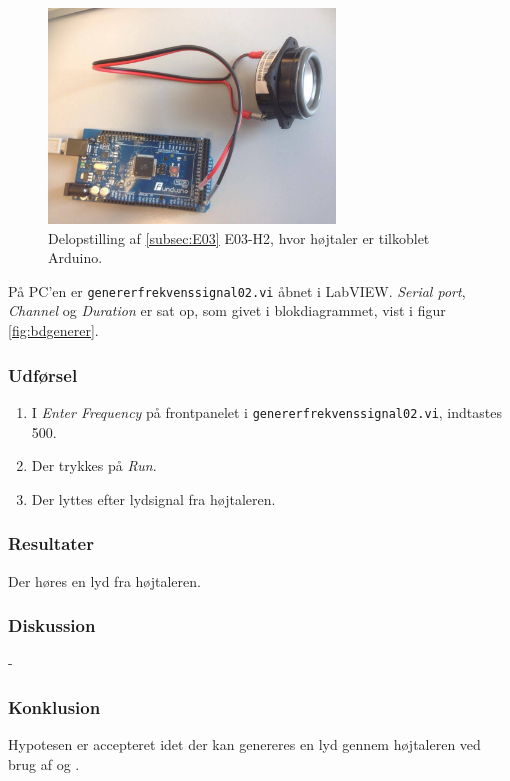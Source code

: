 			\begin{figure}[htb]
			\centering
				\includegraphics[width=3in]{hbArduino}
				\caption{Delopstilling af \ref{subsec:E03} E03-H2, hvor højtaler er tilkoblet Arduino.}	
				\label{fig:tores}
			\end{figure}
	  
		På PC'en er \texttt{genererfrekvenssignal02.vi} åbnet i LabVIEW. \textit{Serial port}, \textit{Channel} og \textit{Duration} er sat op, som givet i blokdiagrammet, vist i figur \ref{fig:bdgenerer}.   \\   
	
	\subsubsection{Udførsel}
			\begin{enumerate} 
				\item I \textit{Enter Frequency} på frontpanelet i \texttt{genererfrekvenssignal02.vi}, indtastes 500. 
				\item Der trykkes på \textit{Run}. 
				\item Der lyttes efter lydsignal fra højtaleren.  
			\end{enumerate}
			
		\subsubsection{Resultater}
		Der høres en lyd fra højtaleren. 
		\subsubsection{Diskussion} 
		-
		\subsubsection{Konklusion}
		Hypotesen er accepteret idet der kan genereres en lyd gennem højtaleren ved brug af \arduino{} og \labview. 
		
